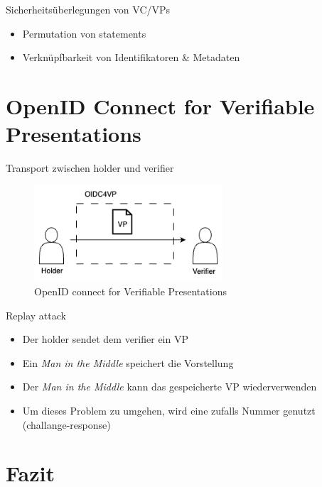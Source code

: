 \documentclass[
	ngerman,%
	authorontitle=true,
	]{bfhbeamer}
\begin{document}
\begin{frame}{Sicherheitsüberlegungen von VC/VPs}
    \begin{itemize}
        \item Permutation von statements
        \item Verknüpfbarkeit von Identifikatoren \& Metadaten
    \end{itemize}
\end{frame}

\section{OpenID Connect for Verifiable Presentations}

\begin{frame}{Transport zwischen holder und verifier}
    \begin{figure}
        \centering
        \includegraphics[width=70mm]{../img/OIDC4VP.png}
        \caption{OpenID connect for Verifiable Presentations}
    \end{figure}
\end{frame}

\begin{frame}{Replay attack}
    \begin{itemize}
        \item Der holder sendet dem verifier ein VP
        \item Ein \textit{Man in the Middle} speichert die Vorstellung
        \item Der \textit{Man in the Middle} kann das gespeicherte VP wiederverwenden
        \item Um dieses Problem zu umgehen, wird eine zufalls Nummer genutzt (challange-response)
    \end{itemize}
\end{frame}

\section{Fazit}
\end{document}
